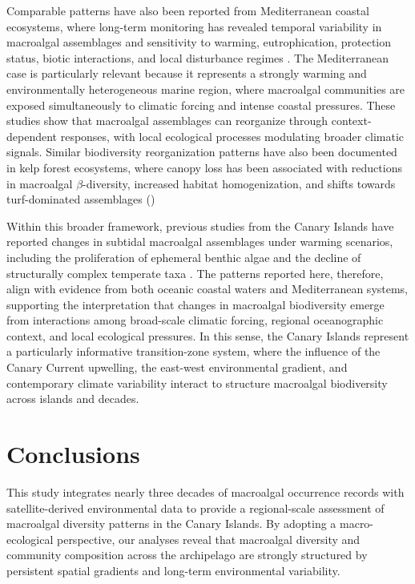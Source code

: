 \documentclass[a4paper,fleqn]{cas-sc}
\begin{document}
Comparable patterns have also been reported from Mediterranean coastal ecosystems, where long-term monitoring has revealed temporal variability in macroalgal assemblages and sensitivity to warming, eutrophication, protection status, biotic interactions, and local disturbance regimes \citep{Medrano2019Long-term, RILOV2020105045}. The Mediterranean case is particularly relevant because it represents a strongly warming and environmentally heterogeneous marine region, where macroalgal communities are exposed simultaneously to climatic forcing and intense coastal pressures. These studies show that macroalgal assemblages can reorganize through context-dependent responses, with local ecological processes modulating broader climatic signals. Similar biodiversity reorganization patterns have also been documented in kelp forest ecosystems, where canopy loss has been associated with reductions in macroalgal $ \beta$-diversity, increased habitat homogenization, and shifts towards turf-dominated assemblages (\cite{PineiroEtAl2024BetaDiversity, FarrellEtAl2026FunctionalDiversity})

Within this broader framework, previous studies from the Canary Islands have reported changes in subtidal macroalgal assemblages under warming scenarios, including the proliferation of ephemeral benthic algae and the decline of structurally complex temperate taxa \cite{SANGIL2012, RIERA2015, Valdazoetal2017}. The patterns reported here, therefore, align with evidence from both oceanic coastal waters and Mediterranean systems, supporting the interpretation that changes in macroalgal biodiversity emerge from interactions among broad-scale climatic forcing, regional oceanographic context, and local ecological pressures. In this sense, the Canary Islands represent a particularly informative transition-zone system, where the influence of the Canary Current upwelling, the east-west environmental gradient, and contemporary climate variability interact to structure macroalgal biodiversity across islands and decades. 

\section{Conclusions}

This study integrates nearly three decades of macroalgal occurrence records with satellite-derived environmental data to provide a regional-scale assessment of macroalgal diversity patterns in the Canary Islands. By adopting a macro-ecological perspective, our analyses reveal that macroalgal diversity and community composition across the archipelago are strongly structured by persistent spatial gradients and long-term environmental variability. 
\end{document}
